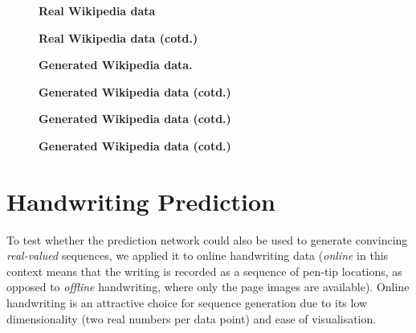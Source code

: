 \begin{figure}
\begin{center}

\end{center}
\caption[Real Wikipedia data]{\textbf{Real Wikipedia data}}
\label{fig:wiki_real_1}
\end{figure}

\begin{figure}
\begin{center}

\end{center}
\caption[Real Wikipedia data (cotd.)]{\textbf{Real Wikipedia data (cotd.)}}
\label{fig:wiki_real_2}
\end{figure}

\begin{figure}
\begin{center}

\end{center}
\caption[Generated Wikipedia data.]{\textbf{Generated Wikipedia data.}}
\label{fig:wiki_gen_0}
\end{figure}

\begin{figure}
\begin{center}

\end{center}
\caption[Generated Wikipedia data (cotd.)]{\textbf{Generated Wikipedia data (cotd.)}}
\label{fig:wiki_gen_1}
\end{figure}

\begin{figure}
\begin{center}

\end{center}
\caption[Generated Wikipedia data (cotd.)]{\textbf{Generated Wikipedia data (cotd.)}}
\label{fig:wiki_gen_2}
\end{figure}

\begin{figure}
\begin{center}

\end{center}
\caption[Generated Wikipedia data (cotd.)]{\textbf{Generated Wikipedia data (cotd.)}}
\label{fig:wiki_gen_3}
\end{figure}

\section{Handwriting Prediction}
\label{sec:hand_pred}
To test whether the prediction network could also be used to generate convincing \emph{real-valued} sequences, we applied it to online handwriting data (\emph{online} in this context means that the writing is recorded as a sequence of pen-tip locations, as opposed to \emph{offline} handwriting, where only the page images are available). Online handwriting is an attractive choice for sequence generation due to its low dimensionality (two real numbers per data point) and ease of visualisation.

